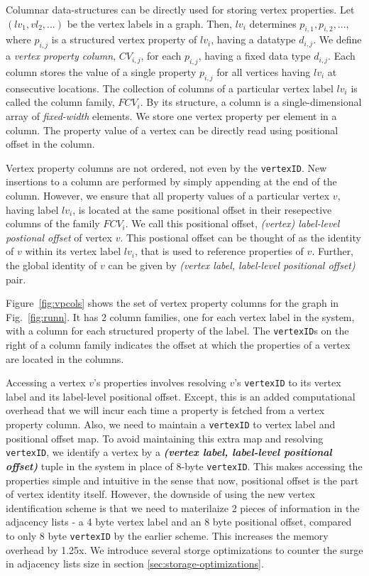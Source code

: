 Columnar data-structures can be directly used for storing vertex properties. Let $(lv_1, vl_2, ...)$ be the vertex labels in a graph. Then, $lv_i$ determines $p_{i,1},  p_{i,2}, ...$, where $p_{i, j}$ is a structured vertex property of $lv_i$, having a datatype $d_{i,j}$. We define a \emph{vertex property column}, $CV_{i,j}$, for each $p_{i,j}$, having a fixed data type $d_{i,j}$. Each column stores the value of a single property $p_{i,j}$ for all vertices having $lv_i$ at consecutive locations. The collection of columns of a particular vertex label $lv_i$ is called the column family, $FCV_i$. By its structure, a column is a single-dimensional array of \emph{fixed-width} elements. We store one vertex property per element in a column. The property value of a vertex can be directly read using positional offset in the column.

Vertex property columns are not ordered, not even by the \texttt{vertexID}. New insertions to a column are performed by simply appending at the end of the column. However, we ensure that all property values of a particular vertex $v$, having label $lv_i$, is located at the same positional offset in their resepective columns of the family $FCV_i$. We call this positional offset, \emph{(vertex) label-level postional offset} of vertex $v$. This postional offset can be thought of as the identity of $v$ within its vertex label $lv_i$, that is used to reference properties of $v$. Further, the global identity of $v$ can be given by \textit{(vertex label, label-level positional offset)} pair. 

Figure~\ref{fig:vpcols} shows the set of vertex property columns for the graph in Fig.~\ref{fig:runn}. It has 2 column families, one for each vertex label in the system, with a column for each structured property of the label. The \texttt{vertexID}s on the right of a column family indicates the offset at which the properties of a vertex are located in the columns.

Accessing a vertex $v$'s properties involves resolving $v$'s \texttt{vertexID} to its vertex label and its label-level positional offset. Except, this is an added computational overhead that we will incur each time a property is fetched from a vertex property column. Also, we need to maintain a \texttt{vertexID} to vertex label and positional offset map. To avoid maintaining this extra map and resolving \texttt{vertexID}, we identify a vertex by a \emph{\textbf{(vertex label, label-level positional offset)}} tuple in the system in place of 8-byte \texttt{vertexID}. This makes accessing the properties simple and intuitive in the sense that now, positional offset is the part of vertex identity itself. However, the downside of using the new vertex identification scheme is that we need to materilaize 2 pieces of information in the adjacency lists - a 4 byte vertex label and an 8 byte positional offset, compared to only 8 byte \texttt{vertexID} by the earlier scheme. This increases the memory overhead by 1.25x. We introduce several storge optimizations to counter the surge in adjacency lists size in section \ref{sec:storage-optimizations}.

